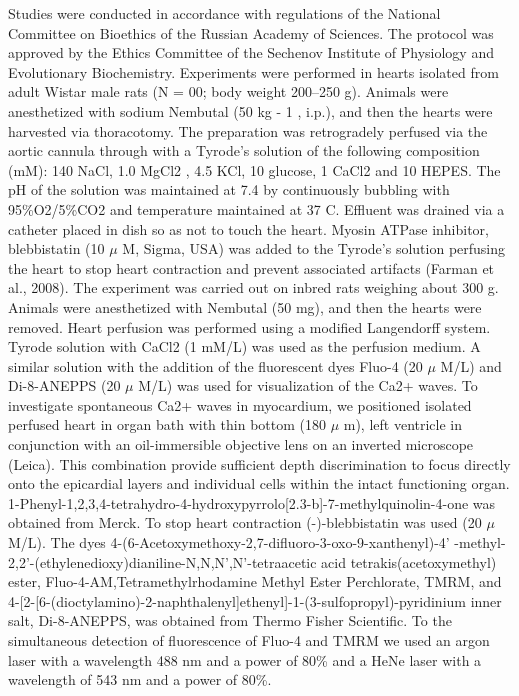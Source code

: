 \documentclass[a4paper,12pt]{article}
\begin{document}
Studies were conducted in accordance with regulations of the National Committee on Bioethics of the Russian Academy of Sciences. The protocol was approved by the Ethics Committee of the Sechenov Institute of Physiology and Evolutionary Biochemistry. Experiments were performed in hearts isolated from adult Wistar male rats (N = 00; body weight 200–250 g).
Animals were anesthetized with sodium Nembutal (50 kg - 1 , i.p.), and then the hearts were harvested via thoracotomy.
The preparation was retrogradely perfused via the aortic cannula through with a Tyrode’s solution of the following composition (mM): 140 NaCl, 1.0 MgCl2 , 4.5 KCl, 10 glucose, 1 CaCl2 and 10 HEPES.
The pH of the solution was maintained at 7.4 by continuously bubbling with 95\%O2/5\%CO2 and temperature maintained at 37 C.
Effluent was drained via a catheter placed in dish so as not to touch the heart. Myosin ATPase inhibitor, blebbistatin (10 $\mu$ M, Sigma, USA) was added to the Tyrode’s solution perfusing the heart to stop heart contraction and prevent associated artifacts (Farman et al., 2008).
The experiment was carried out on inbred rats weighing about 300 g.
Animals were anesthetized with Nembutal (50 mg), and then the hearts were removed.
Heart perfusion was performed using a modified Langendorff system. Tyrode solution with CaCl2 (1 mM/L) was used as the perfusion medium.
A similar solution with the addition of the fluorescent dyes Fluo-4 (20 $\mu$ M/L) and Di-8-ANEPPS (20 $\mu$ M/L) was used for visualization of the Ca2+ waves.
To investigate spontaneous Ca2+ waves in myocardium, we positioned isolated perfused heart in organ bath with thin bottom (180 $\mu$ m), left ventricle in conjunction with an oil-immersible objective lens on an inverted microscope (Leica).
This combination provide sufficient depth discrimination to focus directly onto the epicardial layers and individual cells within the intact functioning organ.
1-Phenyl-1,2,3,4-tetrahydro-4-hydroxypyrrolo[2.3-b]-7-methylquinolin-4-one was obtained from Merck.
To stop heart contraction (-)-blebbistatin was used (20 $\mu$ M/L).
The dyes 4-(6-Acetoxymethoxy-2,7-difluoro-3-oxo-9-xanthenyl)-4' -methyl-2,2'-(ethylenedioxy)dianiline-N,N,N',N'-tetraacetic acid tetrakis(acetoxymethyl) ester, Fluo-4-AM,Tetramethylrhodamine Methyl Ester Perchlorate, TMRM, and 4-[2-[6-(dioctylamino)-2-naphthalenyl]ethenyl]-1-(3-sulfopropyl)-pyridinium inner salt, Di-8-ANEPPS, was obtained from Thermo Fisher Scientific.
To the simultaneous detection of fluorescence of Fluo-4 and TMRM we used an argon laser with a wavelength 488 nm and a power of 80\% and a HeNe laser with a wavelength of 543 nm and a power of 80\%.
\end{document}
